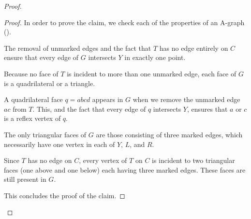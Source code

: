 \begin{proof}
	\begin{proof}
In order to	prove the claim, we check each of the properties of an A-graph
	().
	\begin{compactenum}
		\item The removal of unmarked edges and the fact that $T$ has no
		edge entirely on $C$ ensure that every edge of $G$ intersects $Y$
		in exactly one point.
		\item Because no face of $T$ is incident to more than one unmarked edge,
		each face of $G$ is a quadrilateral or a triangle.  
		\item A quadrilateral face $q=abcd$ appears in $G$ when we remove the unmarked edge $ac$ from $T$. This, and the fact that every edge of $q$ intersects $Y$, ensures that $a$ or $c$ is a reflex vertex of $q$.
		\item The only triangular faces of $G$ are those consisting
		of three marked edges, which necessarily have one vertex in
		each of $Y$, $L$, and $R$.
		\item Since $T$ has no edge on $C$, every vertex of $T$ on $C$
		is incident to two triangular faces (one above and one below)
		each having three marked edges. These faces are still present in $G$.
	\end{compactenum}
This concludes the proof of the claim.
\end{proof}	



\end{proof}
